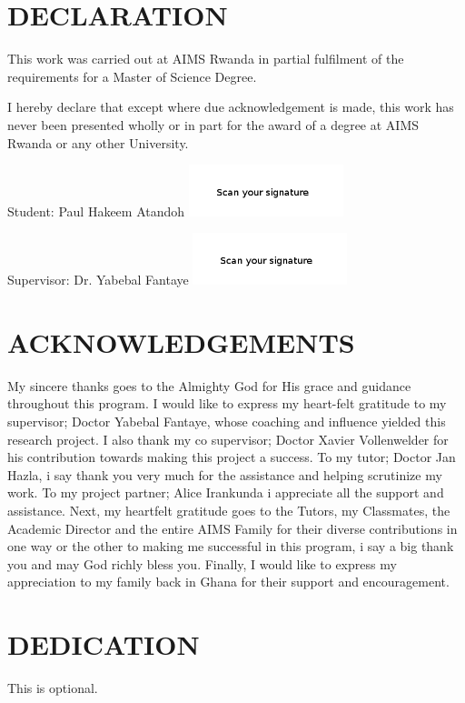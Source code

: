 \chapter*{DECLARATION}
This work was carried out at AIMS Rwanda in partial fulfilment of the requirements for a Master of Science Degree.

I hereby declare that except where due acknowledgement is made, this work has never been presented wholly or in part for the award of a degree at AIMS Rwanda or any other University.

\vspace{1.5cm}
Student: Paul Hakeem Atandoh \includegraphics[height=1.5cm]{images/signature.png}

\vspace{1.5cm}

Supervisor: Dr. Yabebal  Fantaye \includegraphics[height=1.5cm]{images/signature1.png}


\newpage

\chapter*{ACKNOWLEDGEMENTS}
My sincere thanks goes to the Almighty God for His grace and guidance throughout this program. I would like to express my heart-felt gratitude to my supervisor; Doctor Yabebal Fantaye, whose coaching and influence yielded this research project. I also thank my co supervisor; Doctor Xavier Vollenwelder for his contribution towards making this project a success.
To my tutor; Doctor Jan Hazla, i say thank you very much for the assistance and helping scrutinize my work. To my project partner; Alice Irankunda i appreciate all the support and assistance.  Next, my heartfelt gratitude goes to the Tutors, my Classmates, the Academic Director and the entire AIMS Family for their diverse contributions in one way or the other to making me successful in this program, i say a big thank you and may God richly bless you.
Finally, I would like to express my appreciation to my family back in Ghana for their support and encouragement.
\newpage
\chapter*{DEDICATION} 

This is optional.